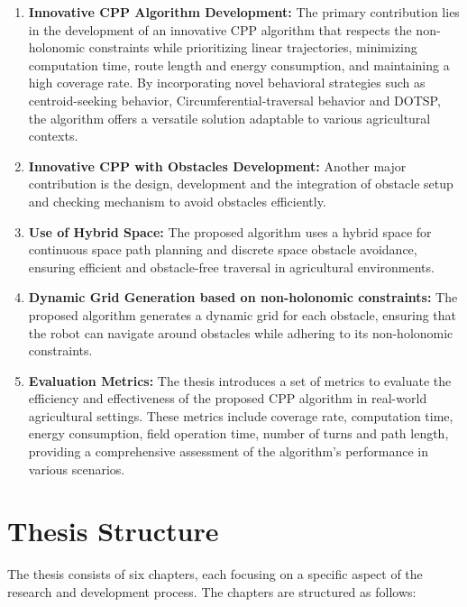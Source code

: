 \begin{enumerate}

  \item \textbf{Innovative CPP Algorithm Development:} The primary contribution lies in the development of an innovative CPP algorithm that respects the non-holonomic constraints while prioritizing linear trajectories, minimizing computation time, route length and energy consumption, and maintaining a high coverage rate. By incorporating novel behavioral strategies such as centroid-seeking behavior, Circumferential-traversal behavior and DOTSP, the algorithm offers a versatile solution adaptable to various agricultural contexts.

  \item \textbf{Innovative CPP with Obstacles Development:} Another major contribution is the design, development and the integration of obstacle setup and checking mechanism to avoid obstacles efficiently. 
  
  \item \textbf{Use of Hybrid Space:} The proposed algorithm uses a hybrid space for continuous space path planning and discrete space obstacle avoidance, ensuring efficient and obstacle-free traversal in agricultural environments.
  
  \item \textbf{Dynamic Grid Generation based on non-holonomic constraints:} The proposed algorithm generates a dynamic grid for each obstacle, ensuring that the robot can navigate around obstacles while adhering to its non-holonomic constraints.
  
  \item \textbf{Evaluation Metrics:} The thesis introduces a set of metrics to evaluate the efficiency and effectiveness of the proposed CPP algorithm in real-world agricultural settings. These metrics include coverage rate, computation time, energy consumption, field operation time, number of turns and path length, providing a comprehensive assessment of the algorithm's performance in various scenarios.
  
\end{enumerate}


\section{Thesis Structure}

The thesis consists of six chapters, each focusing on a specific aspect of the research and development process. The chapters are structured as follows:

